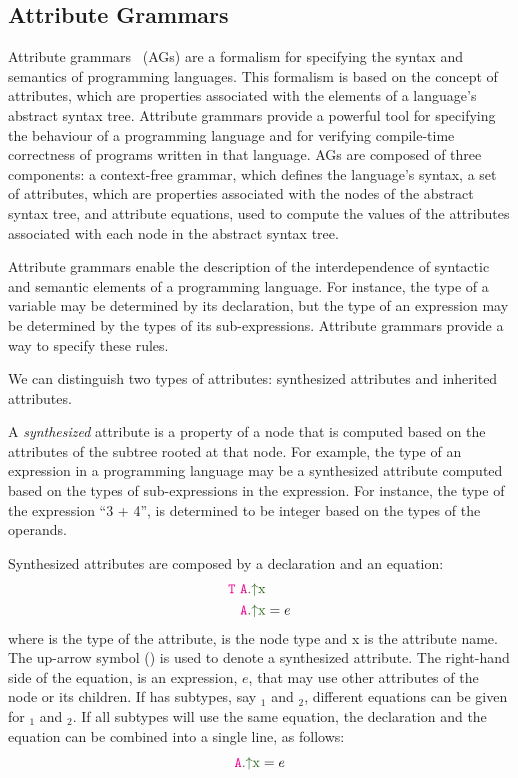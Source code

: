 \subsection{Attribute Grammars}%
\label{chap:attr-grammars}
Attribute grammars~\cite{knuth1968semantics} (AGs) are a formalism for specifying
the syntax and semantics of programming languages. This formalism is based on the concept of attributes,
which are properties associated with the elements of a language's abstract syntax tree.
Attribute grammars provide a powerful tool for specifying the behaviour of a programming
language and for verifying compile-time correctness of programs written in that language.
%
AGs are composed of three components: a context-free grammar,
which defines the language's syntax,  a set of attributes,
which are properties associated with the nodes of the abstract syntax tree,
and attribute equations, used to compute the values of the attributes associated 
with each node in the abstract syntax tree.

Attribute grammars enable the description of the
interdependence of syntactic and semantic elements of a programming language.
For instance, the type of a variable may be determined by its declaration,
but the type of an expression may be determined by the types of its sub-expressions.
Attribute grammars provide a way to specify these rules.

We can distinguish two types of attributes: synthesized attributes and inherited attributes.

A \emph{synthesized} attribute is a property of a node that is computed
based on the attributes of the subtree rooted at that node. For example, the type of an expression
in a programming language may be a synthesized attribute computed based
on the types of sub-expressions in the expression. For instance, the type of the expression ``3 + 4'',
is determined to be integer based on the types of the operands.

Synthesized attributes are composed by a declaration and an equation:
\begin{align*}
  \astnode{T}\ &\Asyn{A}{x} \\
   &\Asyn{A}{x} = e
\end{align*}
where  is the type of the attribute,  is the node type and \textcolor{ATGsym}{x} is the attribute name.
The up-arrow symbol (\textcolor{ATGsym}{\mSyn{}}) is used to denote a synthesized attribute.
The right-hand side of the equation, is an expression, $e$, that may use other attributes of the  node or its children.
If  has subtypes, say $_1$ and $_2$, different equations can be given for
$_1$ and $_2$. If all subtypes will use the same equation, the declaration and the equation can be combined into a single line, as follows:
\begin{equation*}
  \Asyn{A}{x} = e
\end{equation*}

